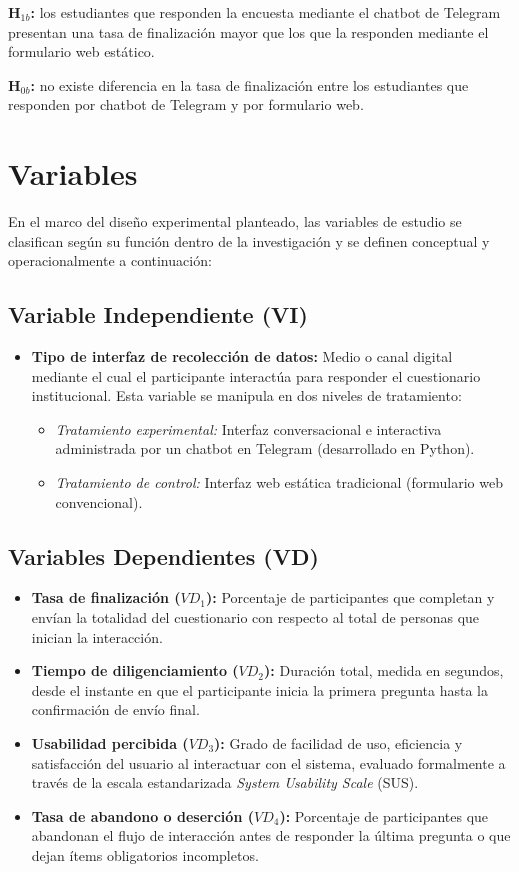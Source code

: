 \documentclass[12pt,letterpaper]{article}
\begin{document}
\textbf{H$_{1b}$:} los estudiantes que responden la encuesta mediante el chatbot de Telegram presentan una tasa de finalización mayor que los que la responden mediante el formulario web estático.

\textbf{H$_{0b}$:} no existe diferencia en la tasa de finalización entre los estudiantes que responden por chatbot de Telegram y por formulario web.

\section{Variables}

En el marco del diseño experimental planteado, las variables de estudio se clasifican según su función dentro de la investigación y se definen conceptual y operacionalmente a continuación:

\subsection{Variable Independiente (VI)}

\begin{itemize}
    \item \textbf{Tipo de interfaz de recolección de datos:} Medio o canal digital mediante el cual el participante interactúa para responder el cuestionario institucional. Esta variable se manipula en dos niveles de tratamiento:
    \begin{itemize}
        \item \textit{Tratamiento experimental:} Interfaz conversacional e interactiva administrada por un chatbot en Telegram (desarrollado en Python).
        \item \textit{Tratamiento de control:} Interfaz web estática tradicional (formulario web convencional).
    \end{itemize}
\end{itemize}

\subsection{Variables Dependientes (VD)}

\begin{itemize}
    \item \textbf{Tasa de finalización ($VD_1$):} Porcentaje de participantes que completan y envían la totalidad del cuestionario con respecto al total de personas que inician la interacción.
    \item \textbf{Tiempo de diligenciamiento ($VD_2$):} Duración total, medida en segundos, desde el instante en que el participante inicia la primera pregunta hasta la confirmación de envío final.
    \item \textbf{Usabilidad percibida ($VD_3$):} Grado de facilidad de uso, eficiencia y satisfacción del usuario al interactuar con el sistema, evaluado formalmente a través de la escala estandarizada \textit{System Usability Scale} (SUS).
    \item \textbf{Tasa de abandono o deserción ($VD_4$):} Porcentaje de participantes que abandonan el flujo de interacción antes de responder la última pregunta o que dejan ítems obligatorios incompletos.
\end{itemize}
\end{document}
